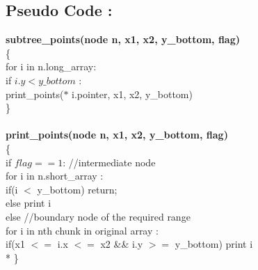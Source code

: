 \documentclass{article}
\begin{document}
\subsection{Pseudo Code : }

{\bf subtree\_points(node n, x1, x2, y\_bottom, flag)}\\
\{\\
    \hspace*{1cm}for i in n.long\_array:\\
    \hspace*{2cm}       if $i.y < y\_bottom$ :\\
    \hspace*{3cm}                        print\_points($*$ i.pointer, x1, x2, y\_bottom)\\            
\}\\
\\
{\bf print\_points(node n, x1, x2, y\_bottom, flag)}\\
\{\\
    \hspace*{1cm}  if $flag==1$:             //intermediate node \\
    \hspace*{1.5cm}for i in n.short\_array :\\
    \hspace*{2cm}    if(i $<$ y\_bottom) return;\\
    \hspace*{2cm}    else print i\\
    \hspace*{1cm}  else     //boundary node of the required range\\
    \hspace*{1.5cm}    for i in nth chunk in original array :\\
    \hspace*{2cm} if(x1 $<=$ i.x $<=$ x2 \&\& i.y $>=$ y\_bottom) print i \\*
\}\\
\end{document}
